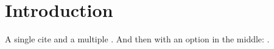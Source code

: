 \documentclass{amsart}
\begin{document}
\section{Introduction}

A single cite \cite{MR1451594}
and a multiple \cites{Weyl,Gould,Rob,MR95f:17013,Ser77}.
And then with an option in the middle:
.

\begin{bibsection}
\begin{biblist}
\end{biblist}
\end{bibsection}
\end{document}
